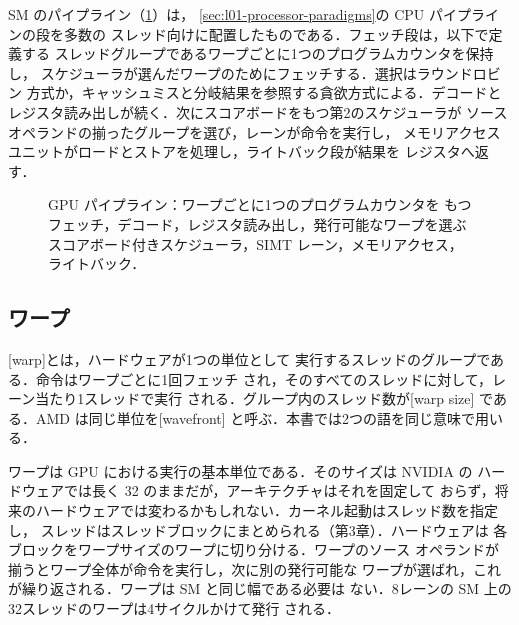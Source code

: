 \documentclass[../main.tex]{subfiles}
\begin{document}
SM のパイプライン（\cref{fig:l01-gpu-pipeline}）は，
\cref{sec:l01-processor-paradigms}の CPU パイプラインの段を多数の
スレッド向けに配置したものである．フェッチ段は，以下で定義する
スレッドグループであるワープごとに1つのプログラムカウンタを保持し，
スケジューラが選んだワープのためにフェッチする．選択はラウンドロビン
方式か，キャッシュミスと分岐結果を参照する貪欲方式による．デコードと
レジスタ読み出しが続く．次にスコアボードをもつ第2のスケジューラが
ソースオペランドの揃ったグループを選び，レーンが命令を実行し，
メモリアクセスユニットがロードとストアを処理し，ライトバック段が結果を
レジスタへ返す．

\begin{figure}[htbp]
  \centering
  
  \caption{GPU パイプライン：ワープごとに1つのプログラムカウンタを
    もつフェッチ，デコード，レジスタ読み出し，発行可能なワープを選ぶ
    スコアボード付きスケジューラ，SIMT レーン，メモリアクセス，
    ライトバック．}
  \label{fig:l01-gpu-pipeline}
\end{figure}

\subsection{ワープ}

\begin{definition}[ワープ]
  \label{def:l01-warp}
  [warp]とは，ハードウェアが1つの単位として
  実行するスレッドのグループである．命令はワープごとに1回フェッチ
  され，そのすべてのスレッドに対して，レーン当たり1スレッドで実行
  される．グループ内のスレッド数が[warp size]
  である．AMD は同じ単位を[wavefront]
  と呼ぶ．本書では2つの語を同じ意味で用いる．
\end{definition}

ワープは GPU における実行の基本単位である．そのサイズは NVIDIA の
ハードウェアでは長く 32 のままだが，アーキテクチャはそれを固定して
おらず，将来のハードウェアでは変わるかもしれない．カーネル起動はスレッド数を指定し，
スレッドはスレッドブロックにまとめられる（第3章）．ハードウェアは
各ブロックをワープサイズのワープに切り分ける．ワープのソース
オペランドが揃うとワープ全体が命令を実行し，次に別の発行可能な
ワープが選ばれ，これが繰り返される．ワープは SM と同じ幅である必要は
ない．8レーンの SM 上の32スレッドのワープは4サイクルかけて発行
される．
\end{document}
